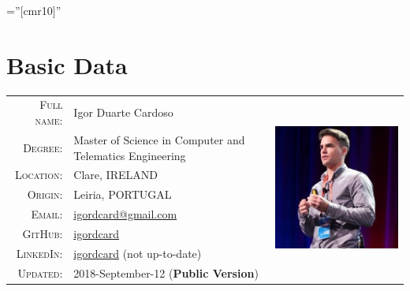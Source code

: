 \documentclass[letter,10pt]{article} %
\begin{document}
\pagestyle{empty} %

\font\fb=''[cmr10]'' %



\par{\bigskip\par} %

\section{Basic Data}

\begin{tabular}{rlr}
\textsc{Full name:} & Igor Duarte Cardoso & \multirow{9}{*}{\includegraphics[scale=0.5]{avatar.jpg}} \\
\textsc{Degree:} & Master of Science in Computer and Telematics Engineering & \\
\textsc{Location:} & Clare, IRELAND & \\
\textsc{Origin:} & Leiria, PORTUGAL & \\
\textsc{Email:} & \href{mailto:igordcard+cv@gmail.com}{igordcard@gmail.com} & \\
\textsc{GitHub:} & \href{https://github.com/igordcard}{igordcard} & \\
\textsc{LinkedIn:} & \href{https://linkedin.com/in/igordcard}{igordcard} (not up-to-date) & \\
\textsc{Updated:} & 2018-September-12 (\textbf{Public Version}) & \\
\end{tabular} \\
\end{document}
